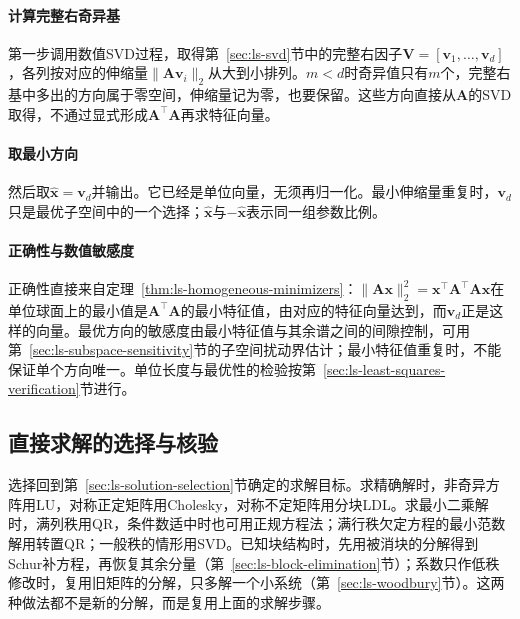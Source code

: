 \paragraph{计算完整右奇异基}
第一步调用数值SVD过程，取得第~\ref{sec:ls-svd}节中的完整右因子$\bm V=[\bm v_1,\ldots,\bm v_d]$，各列按对应的伸缩量$\lVert\bm A\bm v_i\rVert_2$从大到小排列。$m<d$时奇异值只有$m$个，完整右基中多出的方向属于零空间，伸缩量记为零，也要保留。这些方向直接从$\bm A$的SVD取得，不通过显式形成$\bm A^\top\bm A$再求特征向量。

\paragraph{取最小方向}
然后取$\hat{\bm x}=\bm v_d$并输出。它已经是单位向量，无须再归一化。最小伸缩量重复时，$\bm v_d$只是最优子空间中的一个选择；$\hat{\bm x}$与$-\hat{\bm x}$表示同一组参数比例。

\paragraph{正确性与数值敏感度}
正确性直接来自定理~\ref{thm:ls-homogeneous-minimizers}：$\lVert\bm A\bm x\rVert_2^2=\bm x^\top\bm A^\top\bm A\bm x$在单位球面上的最小值是$\bm A^\top\bm A$的最小特征值，由对应的特征向量达到，而$\bm v_d$正是这样的向量。最优方向的敏感度由最小特征值与其余谱之间的间隙控制，可用第~\ref{sec:ls-subspace-sensitivity}节的子空间扰动界估计；最小特征值重复时，不能保证单个方向唯一。单位长度与最优性的检验按第~\ref{sec:ls-least-squares-verification}节进行。

\subsection{直接求解的选择与核验}
\label{sec:ls-direct-method-comparison}

选择回到第~\ref{sec:ls-solution-selection}节确定的求解目标。求精确解时，非奇异方阵用LU，对称正定矩阵用Cholesky，对称不定矩阵用分块LDL。求最小二乘解时，满列秩用QR，条件数适中时也可用正规方程法；满行秩欠定方程的最小范数解用转置QR；一般秩的情形用SVD。已知块结构时，先用被消块的分解得到Schur补方程，再恢复其余分量（第~\ref{sec:ls-block-elimination}节）；系数只作低秩修改时，复用旧矩阵的分解，只多解一个小系统（第~\ref{sec:ls-woodbury}节）。这两种做法都不是新的分解，而是复用上面的求解步骤。

